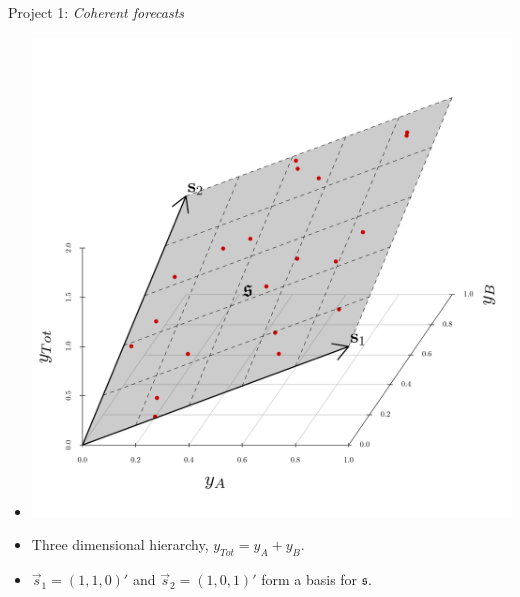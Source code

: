 \documentclass[11pt,xcolor=dvipsnames,table]{beamer} %
\begin{document}
\begin{frame}{Project 1: \textit{Coherent forecasts}}
\begin{itemize}
	\item[] 		
	\begin{center}
	\vspace{-1.5cm}
	\includegraphics[scale=0.40]{Figs/3D_hierarchy}
	\end{center}
	\item Three dimensional hierarchy, $y_{Tot} = y_A + y_B$.
	\item $\vec{s}_1 = (1,1,0)'$ and $\vec{s}_2 = (1, 0, 1)'$ form a basis for $\mathfrak{s}$.
\end{itemize}    
\end{frame}


\end{document}
